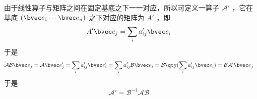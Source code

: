 由于线性算子与矩阵之间在固定基底之下一一对应，所以可定义一算子 $\mathcal{A'}$ ，它在基底 $(\bvec e_1\cdots \bvec e_n)$ 之下对应的矩阵为 $A'$ ，即
\begin{equation}
A'\bvec e_j=\sum_i a'_{ij}\bvec e_i
\end{equation}
于是
\begin{equation}
\mathcal{AB}\bvec e_j=\mathcal{A}\bvec e'_j=\sum_i a'_{ij} \bvec e'_i=\sum_i a'_{ij}\mathcal{B}\bvec e_i=\mathcal{B}\qty(\sum_i a'_{ij}\bvec e_i)=\mathcal{BA'}\bvec e_j
\end{equation}
于是 
\begin{equation}
\mathcal{A'}=\mathcal{B^{-1}AB}
\end{equation}

